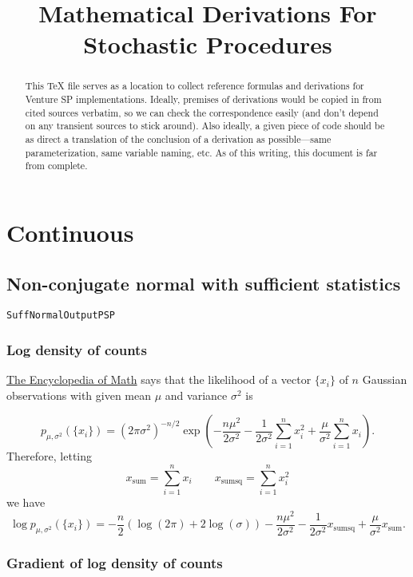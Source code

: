 \documentclass[12pt]{article}
\title{Mathematical Derivations For Stochastic Procedures}
\begin{document}
\maketitle

\begin{abstract}
This TeX file serves as a location to collect reference formulas and
derivations for Venture SP implementations.  Ideally, premises of
derivations would be copied in from cited sources verbatim, so we can
check the correspondence easily (and don't depend on any transient
sources to stick around).  Also ideally, a given piece of code should
be as direct a translation of the conclusion of a derivation as
possible---same parameterization, same variable naming, etc.  As of
this writing, this document is far from complete.
\end{abstract}

\section{Continuous}

\subsection{Non-conjugate normal with sufficient statistics}
\texttt{SuffNormalOutputPSP}

\subsubsection{Log density of counts}
\href{http://www.encyclopediaofmath.org/index.php/Sufficient_statistic}
{The Encyclopedia of Math}
says that the likelihood of a vector $\{x_i\}$ of $n$ Gaussian
observations with given mean $\mu$ and variance $\sigma^2$ is

\[ p_{\mu,\sigma^2}(\{x_i\}) = (2\pi\sigma^2)^{-n/2} \exp\left( -\frac{n \mu^2}{2 \sigma^2}
   - \frac{1}{2 \sigma^2} \sum_{i=1}^n x_i^2 + \frac{\mu}{\sigma^2}\sum_{i=1}^nx_i\right). \]
\newcommand{\xsum}{x_{\textrm{sum}}}
\newcommand{\xsumsq}{x_{\textrm{sumsq}}}
Therefore, letting
\[ \xsum = \sum_{i=1}^nx_i \qquad \xsumsq = \sum_{i=1}^n x_i^2 \]
we have
\[ \log p_{\mu,\sigma^2}(\{x_i\}) = -\frac{n}{2}(\log(2\pi) + 2\log(\sigma))
   -\frac{n \mu^2}{2 \sigma^2}
   - \frac{1}{2 \sigma^2} \xsumsq + \frac{\mu}{\sigma^2}\xsum. \]

\subsubsection{Gradient of log density of counts}
\end{document}
